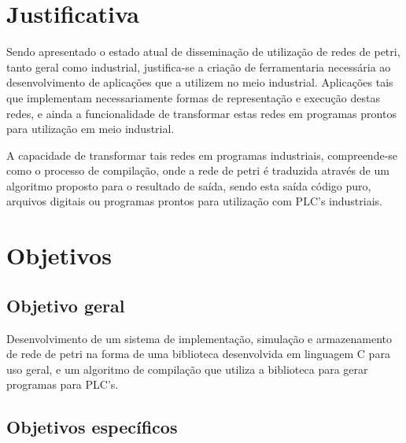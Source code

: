 \section{Justificativa}

Sendo apresentado o estado atual de disseminação de utilização de redes de petri, tanto geral como industrial, justifica-se a criação de ferramentaria necessária ao desenvolvimento de aplicações que a utilizem no meio industrial. Aplicações tais que implementam necessariamente formas de representação e execução destas redes, e ainda a funcionalidade de transformar estas redes em programas prontos para utilização em meio industrial.

A capacidade de transformar tais redes em programas industriais, compreende-se como o processo de compilação, onde a rede de petri é traduzida através de um algoritmo proposto para o resultado de saída, sendo esta saída código puro, arquivos digitais ou programas prontos para utilização com PLC's industriais.

\section{Objetivos}

\subsection{Objetivo geral}

Desenvolvimento de um sistema de implementação, simulação e armazenamento de rede de petri na forma de uma biblioteca desenvolvida em linguagem C para uso geral, e um algoritmo de compilação que utiliza a biblioteca para gerar programas para PLC's.

\subsection{Objetivos específicos}

